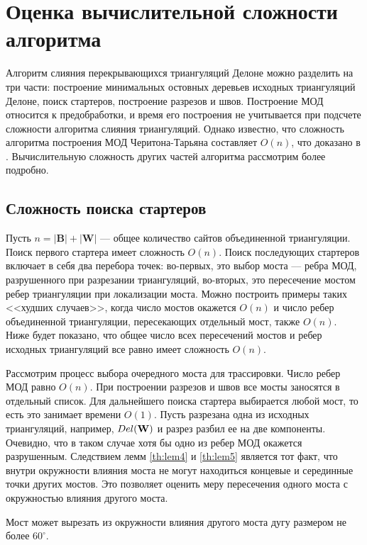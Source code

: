 \documentclass[12pt]{article}
\begin{document}
\section{Оценка вычислительной сложности алгоритма}
Алгоритм слияния перекрывающихся триангуляций Делоне можно разделить на три части:
построение минимальных остовных деревьев исходных триангуляций Делоне,
поиск стартеров, построение разрезов и швов.
Построение МОД относится к предобработки, и время его построения не учитывается при подсчете сложности алгоритма слияния триангуляций.
Однако известно, что сложность алгоритма построения МОД Черитона-Тарьяна составляет $O(n)$, что доказано в \cite[стр.226-230]{Preparata}.
Вычислительную сложность других частей алгоритма рассмотрим более подробно.

\subsection{Сложность поиска стартеров}
Пусть $n = |\textbf{B}| + |\textbf{W}|$ --- общее количество сайтов объединенной триангуляции.
Поиск первого стартера имеет сложность $O(n)$.
Поиск последующих стартеров включает в себя два перебора точек:
во-первых, это выбор моста –-- ребра МОД, разрушенного при разрезании триангуляций,
во-вторых, это пересечение мостом ребер триангуляции при локализации моста.
Можно построить примеры таких <<худших случаев>>, когда число мостов окажется $O(n)$ и
число ребер объединенной триангуляции, пересекающих отдельный мост, также $O(n)$.
Ниже будет показано, что общее число всех пересечений мостов и ребер исходных триангуляций все равно имеет сложность $O(n)$.

Рассмотрим процесс выбора очередного моста для трассировки.
Число ребер МОД равно $O(n)$.
При построении разрезов и швов все мосты заносятся в отдельный список.
Для дальнейшего поиска стартера выбирается любой мост, то есть это занимает времени $O(1)$.
Пусть разрезана одна из исходных триангуляций, например, $Del(\bf{W})$ и разрез разбил ее на две компоненты.
Очевидно, что в таком случае хотя бы одно из ребер МОД окажется разрушенным.
Следствием лемм \ref{th:lem4} и \ref{th:lem5} является тот факт, что внутри окружности влияния моста не могут находиться концевые и серединные точки других мостов.
Это позволяет оценить меру пересечения одного моста с окружностью влияния другого моста.

\begin{lemma}
\label{th:lem8}
Мост может вырезать из окружности влияния другого моста дугу размером не более $60^\circ$.
\end{lemma}
\end{document}
